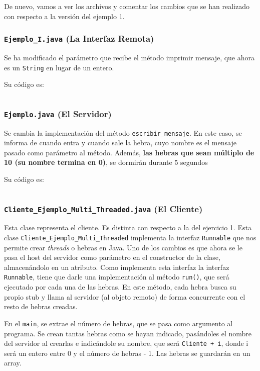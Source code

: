\documentclass[a4paper,12pt]{article}
\begin{document}
			De nuevo, vamos a ver los archivos y comentar los cambios que se han realizado con respecto a la versión del ejemplo 1.
			
			\subsubsection{\texttt{Ejemplo\_I.java} (La Interfaz Remota)}
				Se ha modificado el parámetro que recibe el método imprimir mensaje, que ahora es un \texttt{String} en lugar de un entero.
				
				Su código es:			
				\inputminted[linenos, frame=lines, fontsize=\footnotesize]{Java}{../codigo/Parte_1_Implementacion_de_Ejemplos/Ejemplo_2/Ejemplo_I.java}
			
			\subsubsection{\texttt{Ejemplo.java} (El Servidor)}
				Se cambia la implementación del método \texttt{escribir\_mensaje}. En este caso, se informa de cuando entra y cuando sale la hebra, cuyo nombre es el mensaje pasado como parámetro al método. Además, \textbf{las hebras que sean múltiplo de 10 (su nombre termina en 0)}, se dormirán durante 5 segundos
			
				Su código es:			
				\inputminted[linenos, frame=lines, fontsize=\footnotesize]{Java}{../codigo/Parte_1_Implementacion_de_Ejemplos/Ejemplo_2/Ejemplo.java}
			
			\subsubsection{\texttt{Cliente\_Ejemplo\_Multi\_Threaded.java} (El Cliente)}
				Esta clase representa el cliente. Es distinta con respecto a la del ejercicio 1. Esta clase \texttt{Cliente\_Ejemplo\_Multi\_Threaded} implementa la interfaz \texttt{Runnable} que nos permite crear \textit{threads} o hebras en Java. Uno de los cambios es que ahora se le pasa el host del servidor como parámetro en el constructor de la clase, almacenándolo en un atributo. Como implementa esta interfaz la interfaz \texttt{Runnable}, tiene que darle una implementación al método \texttt{run()}, que será ejecutado por cada una de las hebras. En este método, cada hebra busca su propio stub y llama al servidor (al objeto remoto) de forma concurrente con el resto de hebras creadas.
				
				En el \texttt{main}, se extrae el número de hebras, que se pasa como argumento al programa. Se crean tantas hebras como se hayan indicado, pasándoles el nombre del servidor al crearlas e indicándole su nombre, que será \texttt{Cliente + i}, donde i será un entero entre 0 y el número de hebras - 1. Las hebras se guardarán en un array.
			
\end{document}
